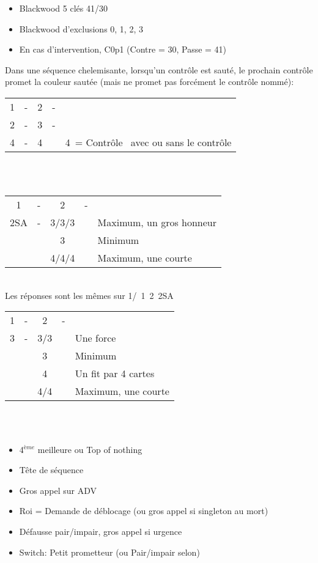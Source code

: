 \documentclass[a4paper, oneside, 11pt]{report}
\begin{document}
	\begin{itemize}
	\item Blackwood 5 clés 41/30
	\item Blackwood d'exclusions 0, 1, 2, 3
	\item En cas d'intervention,  C0p1 (Contre = 30,  Passe = 41)\\
	\end{itemize}

	Dans une séquence chelemisante,  lorsqu'un contrôle est sauté,  le prochain contrôle promet la couleur sautée (mais ne promet pas forcément le contrôle nommé):\\
	\begin{tabular}{cccc|l}
	1\pique & -  & 2\trefle & - &\\
	2\pique & - & 3\pique & - &\\
	4\carreau & - & 4\coeur && 4\coeur\ = Contrôle \trefle\ avec ou sans le contrôle \coeur\\
	\end{tabular}\\\\

	\begin{tabular}{cccc|l}
	1\pique & -  & 2\pique & - &\\
	2SA & - & 3\trefle/3\carreau/3\coeur && Maximum,  un gros honneur\\
	&& 3\pique && Minimum\\
	&& 4\trefle/4\carreau/4\coeur && Maximum,  une courte\\
	\end{tabular}\\
	Les réponses sont les mêmes sur 1\trefle/\carreau\ 1\pique\ 2\pique\ 2SA\\

	\begin{tabular}{cccc|l}
	1\pique & -  & 2\pique & - &\\
	3\trefle & - & 3\carreau/3\coeur && Une force\\
	&& 3\pique && Minimum\\
	&& 4\trefle && Un fit par 4 cartes\\
	&& 4\carreau/4\coeur && Maximum,  une courte\\
	\end{tabular}\\\\

		\begin{itemize}
		\item 4$^{ème}$ meilleure ou Top of nothing
		\item Tête de séquence
		\item Gros appel sur ADV
		\item Roi = Demande de déblocage (ou gros appel si singleton au mort)
		\item Défausse pair/impair,  gros appel si urgence
		\item Switch: Petit prometteur (ou Pair/impair selon)\\
		\end{itemize}
\end{document}
